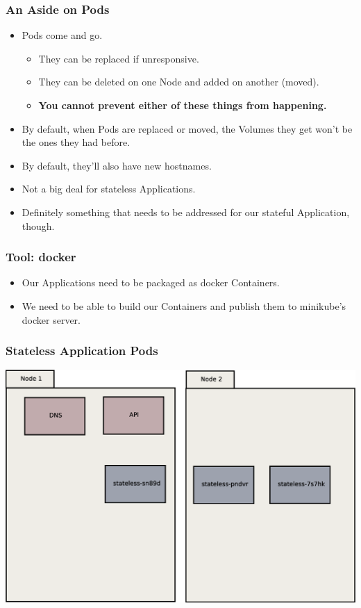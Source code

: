 \documentclass{beamer}
\begin{document}
\begin{frame}
    \frametitle{An Aside on Pods}
    \begin{itemize}
        \item Pods come and go.
        \begin{itemize}
            \item They can be replaced if unresponsive.
            \item They can be deleted on one Node and added on another (moved).
            \item \textbf{You cannot prevent either of these things from happening.}
        \end{itemize}
        \item By default, when Pods are replaced or moved, the Volumes they get won't be the ones they had before.
        \item By default, they'll also have new hostnames.
        \item Not a big deal for stateless Applications.
        \item Definitely something that needs to be addressed for our stateful Application, though.
    \end{itemize}
\end{frame}

\begin{frame}
    \frametitle{Tool: docker\footnotemark}
    \begin{itemize}
        \item Our Applications need to be packaged as docker Containers.
        \item We need to be able to build our Containers and publish them to minikube's docker server.
    \end{itemize}
\end{frame}

\begin{frame}
    \frametitle{Stateless Application Pods}
    \includegraphics[width=\textwidth,height=0.85\textheight,keepaspectratio]{graphics/02-statelessAppPods.eps}
\end{frame}
\end{document}
